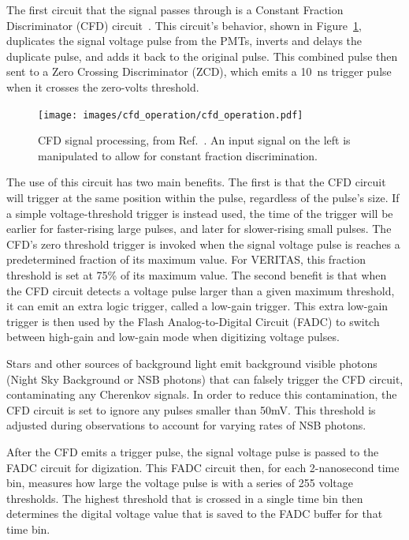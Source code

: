 The first circuit that the signal passes through is a Constant Fraction Discriminator (CFD) circuit~\cite{cfd_behavior}.
This circuit's behavior, shown in Figure~\ref{fig:cfd_operation}, duplicates the signal voltage pulse from the PMTs, inverts and delays the duplicate pulse, and adds it back to the original pulse.
This combined pulse then sent to a Zero Crossing Discriminator (ZCD), which emits a \SI{10}{ns} trigger pulse when it crosses the zero-volts threshold.

\begin{figure}[ht]
  \centering
  \texttt{[image: images/cfd\_operation/cfd\_operation.pdf]}
  \caption[CFD Operation]{
    CFD signal processing, from Ref.~\cite{cfd_operation}.
    An input signal on the left is manipulated to allow for constant fraction discrimination.
  }
  \label{fig:cfd_operation}
\end{figure}

The use of this circuit has two main benefits.
The first is that the CFD circuit will trigger at the same position within the pulse, regardless of the pulse's size.
If a simple voltage-threshold trigger is instead used, the time of the trigger will be earlier for faster-rising large pulses, and later for slower-rising small pulses.
The CFD's zero threshold trigger is invoked when the signal voltage pulse is reaches a predetermined fraction of its maximum value.
For VERITAS, this fraction threshold is set at 75\% of its maximum value.
The second benefit is that when the CFD circuit detects a voltage pulse larger than a given maximum threshold, it can emit an extra logic trigger, called a low-gain trigger.
This extra low-gain trigger is then used by the Flash Analog-to-Digital Circuit (FADC) to switch between high-gain and low-gain mode when digitizing voltage pulses.

Stars and other sources of background light emit background visible photons (Night Sky Background or NSB photons) that can falsely trigger the CFD circuit, contaminating any Cherenkov signals.
In order to reduce this contamination, the CFD circuit is set to ignore any pulses smaller than 50mV.
This threshold is adjusted during observations to account for varying rates of NSB photons.

After the CFD emits a trigger pulse, the signal voltage pulse is passed to the FADC circuit for digization.
This FADC circuit then, for each 2-nanosecond time bin, measures how large the voltage pulse is with a series of 255 voltage thresholds.
The highest threshold that is crossed in a single time bin then determines the digital voltage value that is saved to the FADC buffer for that time bin.

